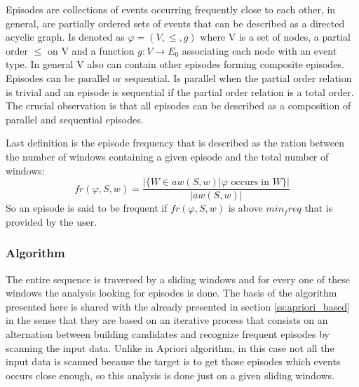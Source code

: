Episodes are collections of events occurring frequently close to each other, in
general, are partially ordered sets of events that can be described as a
directed acyclic graph. Is denoted as $\varphi =(V,\le,g)$ where V is a set of
nodes, a partial order $\le$ on V and a function $g:V \rightarrow E_{0}$
associating each node with an event type. In general V also can contain other
episodes forming composite episodes. Episodes can be parallel or sequential.
Is parallel when the partial order relation is trivial and an episode is
sequential if the partial order relation is a total order. The crucial
observation is that all episodes can be described as a composition of parallel
and sequential episodes.

Last definition is the episode frequency that is described as the ration between
the number of windows containing a given episode and the total number of
windows:
$$
fr(\varphi,S,w)=\frac{|\text{\{}W \in aw(S,w) | \varphi \text{ occurs in }
W\text{\}}|}{|aw(S,w)|}
$$
So an episode is said to be frequent if $fr(\varphi,S,w)$ is above $min_freq$
that is provided by the user.

\subsubsection{Algorithm}

The entire sequence is traversed by a sliding windows and for every one of these
windows the analysis looking for episodes is done. The basis of the algorithm 
presented here is shared with the already presented
in section \ref{ss:apriori_based} in the sense that they are based on an
iterative process that consists on an alternation between building candidates 
and recognize frequent episodes by scanning the input data. Unlike in Apriori
algorithm, in this case not all the input data is scanned because the target is 
to get those episodes which events occurs close enough, so this analysis is done
just on a given sliding windows. 

